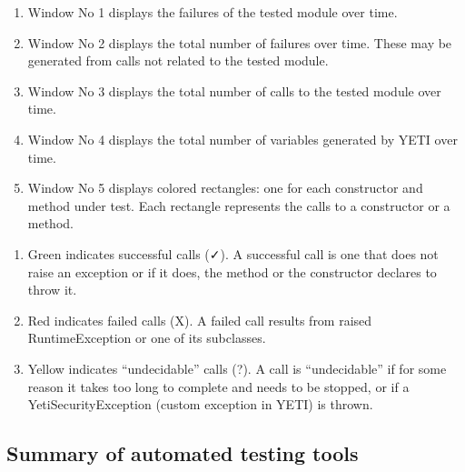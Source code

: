 \begin{enumerate}
\item Window No 1 displays the failures of the tested module over time.
\item Window No 2 displays the total number of failures over time. These may be generated from calls not related to the tested module.
\item Window No 3 displays the total number of calls to the tested module over time. 
\item Window No 4 displays the total number of variables generated by YETI over time.
\item Window No 5 displays colored rectangles: one for each constructor and method under test. Each rectangle represents the calls to a constructor or a method.
\end{enumerate}
\begin{enumerate}
The colors in a rectangle have the following meaning:
\item Green indicates successful calls (✓). A successful call is one that does not raise an exception or if it does, the method or the constructor declares to throw it.
\item Red indicates failed calls (X). A failed call results from raised RuntimeException or one of its subclasses.
\item Yellow indicates “undecidable” calls (?). A call is “undecidable” if for some reason it takes too long to complete and needs to be stopped, or if a YetiSecurityException (custom exception in YETI) is thrown.
\end{enumerate}


\subsection{Summary of automated testing tools}

